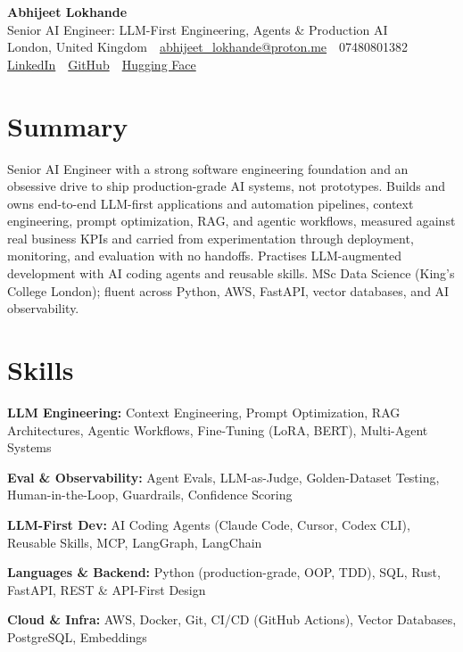 \documentclass[10pt,a4paper]{article}
\newcommand{\sep}{\,\textcolor{accent!60}{\textbar}\,}
\begin{document}
\begin{center}
  {\fontsize{24}{26}\selectfont\bfseries Abhijeet Lokhande}\\[3pt]
  {\color{accent}\large Senior AI Engineer: LLM-First Engineering, Agents \& Production AI}\\[5pt]
  {\small
    London, United Kingdom \sep
    \href{mailto:abhijeet_lokhande@proton.me}{abhijeet\_lokhande@proton.me} \sep
    07480801382 \\[2pt]
    \href{https://www.linkedin.com/in/ablds/}{LinkedIn} \sep
    \href{https://github.com/abhijeetscode}{GitHub} \sep
    \href{https://huggingface.co/ab-ai}{Hugging Face}
  }
\end{center}
\vspace{2pt}

\section{Summary}
Senior AI Engineer with a strong software engineering foundation and an obsessive drive to ship production-grade AI systems, not prototypes. Builds and owns end-to-end LLM-first applications and automation pipelines, context engineering, prompt optimization, RAG, and agentic workflows, measured against real business KPIs and carried from experimentation through deployment, monitoring, and evaluation with no handoffs. Practises LLM-augmented development with AI coding agents and reusable skills. MSc Data Science (King's College London); fluent across Python, AWS, FastAPI, vector databases, and AI observability.

\section{Skills}
\begin{tight}
  \item[\textcolor{accent}{\small$\bullet$}] \textbf{LLM Engineering:} Context Engineering, Prompt Optimization, RAG Architectures, Agentic Workflows, Fine-Tuning (LoRA, BERT), Multi-Agent Systems
  \item[\textcolor{accent}{\small$\bullet$}] \textbf{Eval \& Observability:} Agent Evals, LLM-as-Judge, Golden-Dataset Testing, Human-in-the-Loop, Guardrails, Confidence Scoring
  \item[\textcolor{accent}{\small$\bullet$}] \textbf{LLM-First Dev:} AI Coding Agents (Claude Code, Cursor, Codex CLI), Reusable Skills, MCP, LangGraph, LangChain
  \item[\textcolor{accent}{\small$\bullet$}] \textbf{Languages \& Backend:} Python (production-grade, OOP, TDD), SQL, Rust, FastAPI, REST \& API-First Design
  \item[\textcolor{accent}{\small$\bullet$}] \textbf{Cloud \& Infra:} AWS, Docker, Git, CI/CD (GitHub Actions), Vector Databases, PostgreSQL, Embeddings
\end{tight}
\end{document}
